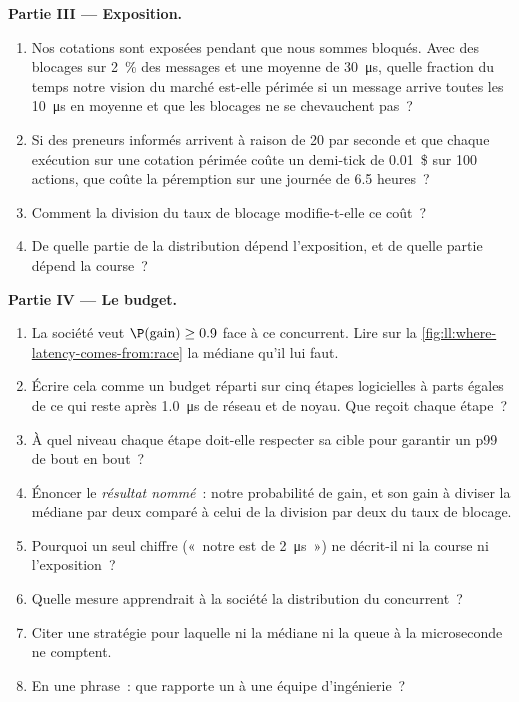 \begin{problem}
\medskip\noindent\textbf{Partie III --- Exposition.}
\begin{enumerate}[resume]
\item Nos cotations sont exposées pendant que nous sommes bloqués. Avec des blocages sur 2~\% des messages et une moyenne de
\qty{30}{\micro\second}, quelle fraction du temps notre vision du marché est-elle périmée si un message arrive toutes les
\qty{10}{\micro\second} en moyenne et que les blocages ne se chevauchent pas~?
\item Si des preneurs informés arrivent à raison de 20 par seconde et que chaque exécution sur une cotation périmée coûte un demi-tick de 0.01~\$ sur 100
actions, que coûte la péremption sur une journée de 6.5 heures~?
\item Comment la division du taux de blocage modifie-t-elle ce coût~?
\item De quelle partie de la distribution dépend l'exposition, et de quelle partie dépend la course~?
\end{enumerate}

\medskip\noindent\textbf{Partie IV --- Le budget.}
\begin{enumerate}[resume]
\item La société veut $\P(\text{gain}) \ge 0.9$ face à ce concurrent. Lire sur la
\cref{fig:ll:where-latency-comes-from:race} la médiane qu'il lui faut.
\item Écrire cela comme un budget réparti sur cinq étapes logicielles à parts égales de ce qui reste après
\qty{1.0}{\micro\second} de réseau et de noyau. Que reçoit chaque étape~?
\item À quel niveau chaque étape doit-elle respecter sa cible pour garantir un p99 de bout en bout~?
\item Énoncer le \emph{résultat nommé}~: notre probabilité de gain, et son gain à diviser la médiane par deux comparé à celui de la division par deux du
taux de blocage.
\item Pourquoi un seul chiffre («~notre  est de \qty{2}{\micro\second}~») ne décrit-il ni la course ni l'exposition~?
\item Quelle mesure apprendrait à la société la distribution du concurrent~?
\item Citer une stratégie pour laquelle ni la médiane ni la queue à la microseconde ne comptent.
\item En une phrase~: que rapporte un  à une équipe d'ingénierie~?
\end{enumerate}
\end{problem}

